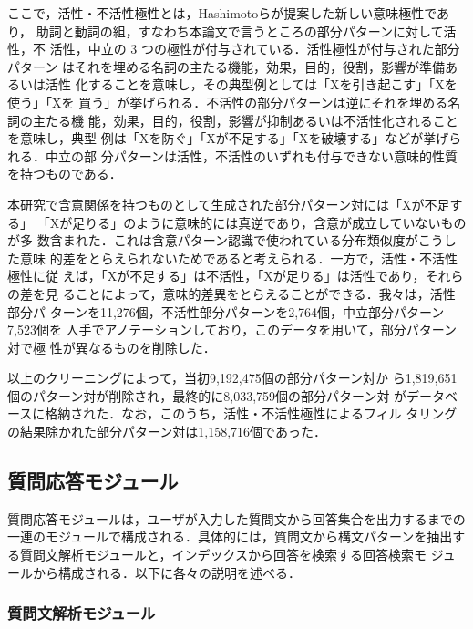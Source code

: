 \documentclass[japanese]{jnlp_1.4}
\begin{document}
ここで，活性・不活性極性とは，Hashimotoらが提案した新しい意味極性であり，
助詞と動詞の組，すなわち本論文で言うところの部分パターンに対して活性，不
活性，中立の 3 つの極性が付与されている．活性極性が付与された部分パターン
はそれを埋める名詞の主たる機能，効果，目的，役割，影響が準備あるいは活性
化することを意味し，その典型例としては「Xを引き起こす」「Xを使う」「Xを
買う」が挙げられる．不活性の部分パターンは逆にそれを埋める名詞の主たる機
能，効果，目的，役割，影響が抑制あるいは不活性化されることを意味し，典型
例は「Xを防ぐ」「Xが不足する」「Xを破壊する」などが挙げられる．中立の部
分パターンは活性，不活性のいずれも付与できない意味的性質を持つものである．

本研究で含意関係を持つものとして生成された部分パターン対には「Xが不足する」
「Xが足りる」のように意味的には真逆であり，含意が成立していないものが多
数含まれた．これは含意パターン認識で使われている分布類似度がこうした意味
的差をとらえられないためであると考えられる．一方で，活性・不活性極性に従
えば，「Xが不足する」は不活性，「Xが足りる」は活性であり，それらの差を見
ることによって，意味的差異をとらえることができる．我々は，活性部分パ
ターンを11,276個，不活性部分パターンを2,764個，中立部分パターン7,523個を
人手でアノテーションしており，このデータを用いて，部分パターン対で極
性が異なるものを削除した．

以上のクリーニングによって，当初9,192,475個の部分パターン対か
ら1,819,651個のパターン対が削除され，最終的に8,033,759個の部分パターン対
がデータベースに格納された．なお，このうち，活性・不活性極性によるフィル
タリングの結果除かれた部分パターン対は1,158,716個であった．


\subsection{質問応答モジュール}

質問応答モジュールは，ユーザが入力した質問文から回答集合を出力するまでの
一連のモジュールで構成される．具体的には，質問文から構文パターンを抽出す
る質問文解析モジュールと，インデックスから回答を検索する回答検索モ
ジュールから構成される．以下に各々の説明を述べる．


\subsubsection{質問文解析モジュール}
\end{document}
